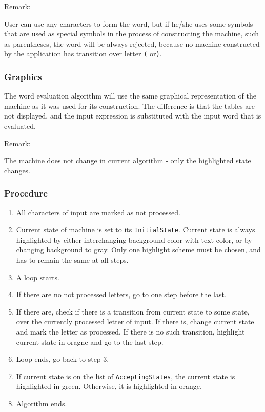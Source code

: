 \documentclass{article}
\begin{document}
Remark:

User can use any characters to form the word, but if he/she uses some symbols that are used as
special symbols in the process of constructing the machine, such as parentheses, the word will be
always rejected, because no machine constructed by the application has transition over letter
\verb|(| or\verb|)|.

\subsubsection{Graphics}

The word evaluation algorithm will use the same graphical representation of the machine as it was
used for its construction. The difference is that the tables are not displayed, and the input
expression is substituted with the input word that is evaluated.

Remark:

The machine does not change in current algorithm - only the highlighted state changes.


\subsubsection{Procedure}

\begin{enumerate}

  \item All characters of input are marked as not processed.

  \item Current state of machine is set to its \verb|InitialState|. Current state is always
  highlighted by either interchanging background color with text color, or by changing background to
  gray. Only one highlight scheme must be chosen, and has to remain the same at all steps.

  \item A loop starts.

  \item If there are no not processed letters, go to one step before the last. 

  \item If there are, check if there is a transition from current state to some state, over the
  currently processed letter of input. If there is, change current state and mark the letter as
  processed. If there is no such transition, highlight current state in oragne and go to the last step.

  \item Loop ends, go back to step 3.

  \item If current state is on the list of \verb|AcceptingStates|, the current state is highlighted
  in green. Otherwise, it is highlighted in orange.

  \item Algorithm ends. 

\end{enumerate}
\end{document}
